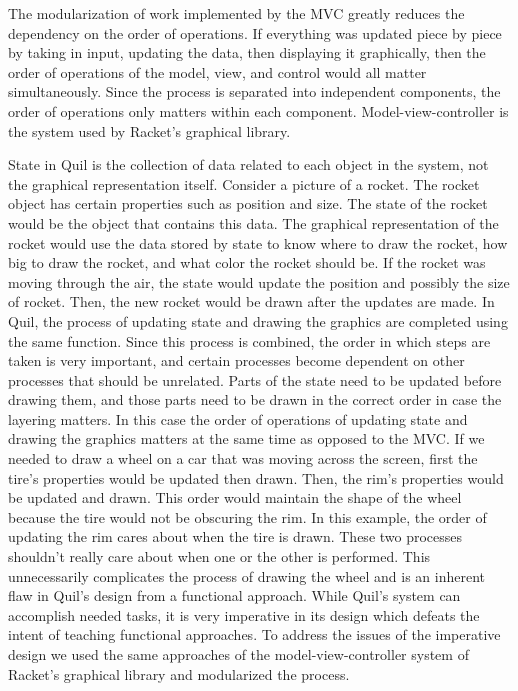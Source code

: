\documentclass[12pt]{article}
\begin{document}
The modularization of work implemented by the MVC greatly reduces the dependency on the order of operations. If everything was updated piece by piece by taking in input, updating the data, then displaying it graphically, then the order of operations of the model, view, and control would all matter simultaneously. Since the process is separated into independent components, the order of operations only matters within each component. Model-view-controller is the system used by Racket's graphical library.

State in Quil is the collection of data related to each object in the system, not the graphical representation itself. Consider a picture of a rocket. The rocket object has certain properties such as position and size. The state of the rocket would be the object that contains this data. The graphical representation of the rocket would use the data stored by state to know where to draw the rocket, how big to draw the rocket, and what color the rocket should be. If the rocket was moving through the air, the state would update the position and possibly the size of rocket. Then, the new rocket would be drawn after the updates are made. In Quil, the process of updating state and drawing the graphics are completed using the same function. Since this process is combined, the order in which steps are taken is very important, and certain processes become dependent on other processes that should be unrelated. Parts of the state need to be updated before drawing them, and those parts need to be drawn in the correct order in case the layering matters. In this case the order of operations of updating state and drawing the graphics matters at the same time as opposed to the MVC. If we needed to draw a wheel on a car that was moving across the screen, first the tire's properties would be updated then drawn. Then, the rim's properties would be updated and drawn. This order would maintain the shape of the wheel because the tire would not be obscuring the rim. In this example, the order of updating the rim cares about when the tire is drawn. These two processes shouldn't really care about when one or the other is performed. This unnecessarily complicates the process of drawing the wheel and is an inherent flaw in Quil's design from a functional approach. While Quil's system can accomplish needed tasks, it is very imperative in its design which defeats the intent of teaching functional approaches. To address the issues of the imperative design we used the same approaches of the model-view-controller system of Racket's graphical library and modularized the process.
\end{document}
